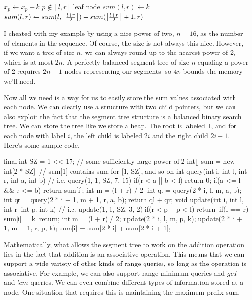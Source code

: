 \noindent \begin{minipage}{\textwidth}
\begin{algorithmic}
	\Comment $x_p \gets x_p + k$
		\Comment $p \not\in [l,r]$
		\State \Return
	\EndIf
		\Comment leaf node
		\State $sum(l,r) \gets k$
		\State \Return
	\EndIf
	\State {}
	\State {}
	\State $sum(l,r) \gets sum(l,\left\lfloor \frac{l+r}{2} \right\rfloor) + sum(\left\lfloor \frac{l+r}{2} \right\rfloor+1,r)$
\EndFunction
\end{algorithmic}
\end{minipage}

I cheated with my example by using a nice power of two, $n=16$, as the number of elements in the sequence. Of course, the size is not always this nice. However, if we want a tree of size $n$, we can always round up to the nearest power of 2, which is at most $2n$. A perfectly balanced segment tree of size $n$ equaling a power of 2 requires $2n-1$ nodes representing our segments, so $4n$ bounds the memory we'll need.

Now all we need is a way for us to easily store the sum values associated with each node. We can clearly use a structure with two child pointers, but we can also exploit the fact that the segment tree structure is a balanced binary search tree. We can store the tree like we store a heap. The root is labeled 1, and for each node with label $i$, the left child is labeled $2i$ and the right child $2i + 1$. Here's some sample code.

\begin{mylstlisting}
final int SZ = 1 << 17; // some sufficiently large power of 2
int[] sum = new int[2 * SZ]; // sum[1] contains sum for [1, SZ], and so on
int query(int i, int l, int r, int a, int b) {
	// i.e. query(1, 1, SZ, 7, 15)
	if(r < a || b < l) return 0;
	if(a <= l && r <= b) return sum[i];
	int m = (l + r) / 2;
	int ql = query(2 * i, l, m, a, b);
	int qr = query(2 * i + 1, m + 1, r, a, b);
	return ql + qr;
}
void update(int i, int l, int r, int p, int k) {
	// i.e. update(1, 1, SZ, 3, 2)
	if(r < p || p < l) return;
	if(l == r){
		sum[i] = k;
		return;
	}
	int m = (l + r) / 2;
	update(2 * i, l, m, p, k);
	update(2 * i + 1, m + 1, r, p, k);
	sum[i] = sum[2 * i] + sum[2 * i + 1];
}
\end{mylstlisting}

Mathematically, what allows the segment tree to work on the addition operation lies in the fact that addition is an associative operation. This means that we can support a wide variety of other kinds of range queries, so long as the operation is associative. For example, we can also support range minimum queries and $gcd$ and $lcm$ queries. We can even combine different types of information stored at a node. One situation that requires this is maintaining the maximum prefix sum.

